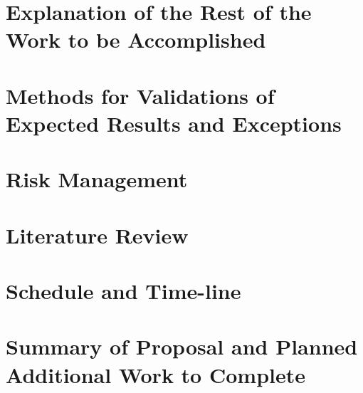 \documentclass[11pt,journal, a4paper]{IEEEtran}
\begin{document}
\section{Explanation of the Rest of the Work to be Accomplished}
\noindent


\section{Methods for Validations of Expected Results and Exceptions}
\noindent


\section{Risk Management}
\noindent


\section{Literature Review}
\noindent



\section{Schedule and Time-line}
\noindent


\section{Summary of Proposal and Planned Additional Work to Complete}
\noindent




\end{document}
